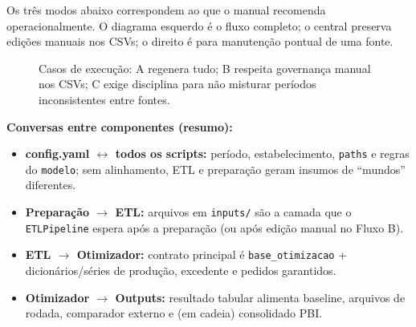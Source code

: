 \documentclass[11pt,a4paper]{article}
\begin{document}
Os três modos abaixo correspondem ao que o manual recomenda operacionalmente.
O diagrama esquerdo é o fluxo completo; o central preserva edições manuais nos
CSVs; o direito é para manutenção pontual de uma fonte.

\begin{figure}[htbp]
\centering
{}
\caption{Casos de execução: A regenera tudo; B respeita governança manual nos
CSVs; C exige disciplina para não misturar períodos inconsistentes entre
fontes.}
\label{fig:fluxo-casos}
\end{figure}

\textbf{Conversas entre componentes (resumo):}
\begin{itemize}[leftmargin=1.2cm]
    \item \textbf{config.yaml $\leftrightarrow$ todos os scripts:} período,
    estabelecimento, \texttt{paths} e regras do \texttt{modelo}; sem alinhamento,
    ETL e preparação geram insumos de ``mundos'' diferentes.
    \item \textbf{Preparação $\rightarrow$ ETL:} arquivos em \texttt{inputs/} são
    a camada que o \texttt{ETLPipeline} espera após a preparação (ou após edição
    manual no Fluxo B).
    \item \textbf{ETL $\rightarrow$ Otimizador:} contrato principal é
    \texttt{base\_otimizacao} + dicionários/séries de produção, excedente e
    pedidos garantidos.
    \item \textbf{Otimizador $\rightarrow$ Outputs:} resultado tabular alimenta
    baseline, arquivos de rodada, comparador externo e (em cadeia) consolidado
    PBI.
\end{itemize}
\end{document}
